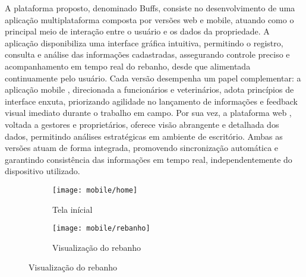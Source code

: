 A plataforma proposto, denominado Buffs, consiste no desenvolvimento de uma aplicação multiplataforma composta por versões web e mobile, atuando como o principal meio de interação entre o usuário e os dados da propriedade. A aplicação disponibiliza uma interface gráfica intuitiva, permitindo o registro, consulta e análise das informações cadastradas, assegurando controle preciso e acompanhamento em tempo real do rebanho, desde que alimentada continuamente pelo usuário. Cada versão desempenha um papel complementar: a aplicação mobile , direcionada a funcionários e veterinários, adota princípios de interface enxuta, priorizando agilidade no lançamento de informações e feedback visual imediato durante o trabalho em campo. Por sua vez, a plataforma web , voltada a gestores e proprietários, oferece visão abrangente e detalhada dos dados, permitindo análises estratégicas em ambiente de escritório. Ambas as versões atuam de forma integrada, promovendo sincronização automática e garantindo consistência das informações em tempo real, independentemente do dispositivo utilizado.

\newpage

\begin{figure}[!h]
\centering
\caption{Telas Aplicativo Mobile}%
\label{fig:mobile}
\begin{subfigure}[b]{0.25\textwidth}
    \centering
    \texttt{[image: mobile/home]}
    \caption{Tela inícial}
    \label{fig:web_coleta}
\end{subfigure}
\hspace{2cm}
\begin{subfigure}[b]{0.25\textwidth}
    \centering
    \texttt{[image: mobile/rebanho]}
    \caption{Visualização do rebanho}
    \label{fig:web_piquete}
\end{subfigure}
\end{figure}


